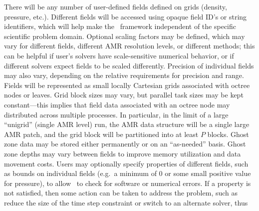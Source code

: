 \documentclass[11pt,letterpaper]{article}
\begin{document}
%
There will be any number of user-defined fields defined on grids
(density, pressure, etc.).  Different fields will be accessed using
opaque field ID's or string identifiers, which will help make the
\cello\ framework independent of the specific scientific problem
domain.  Optional scaling factors may be defined, which may vary for
different fields, different AMR resolution levels, or different
methods; this can be helpful if user's solvers have scale-sensitive
numerical behavior, or if different solvers expect fields to be scaled
differently.  Precision of individual fields may also vary, depending
on the relative requirements for precision and range.
%
Fields will be represented as small locally Cartesian grids associated
with octree nodes or leaves.  Grid block sizes may vary, but parallel
task sizes may be kept constant---this implies that field data
associated with an octree node may distributed across multiple
processes.  In particular, in the limit of a large ``unigrid'' (single
AMR level) run, the AMR data structure will be a single large AMR
patch, and the grid block will be partitioned into at least $P$
blocks.  Ghost zone data may be stored either permanently or on an
``as-needed'' basis.  Ghost zone depths may vary between fields to
improve memory utilization and data movement costs.
%
Users may optionally specify properties of different fields, such as
bounds on individual fields (e.g.~a minimum of $0$ or some small
positive value for pressure), to allow \cello\ to check for software
or numerical errors.   
If a property is not satisfied, then some action can be taken to
address the problem, such as reduce the size of the time step
constraint or switch to an alternate solver, thus
\end{document}
